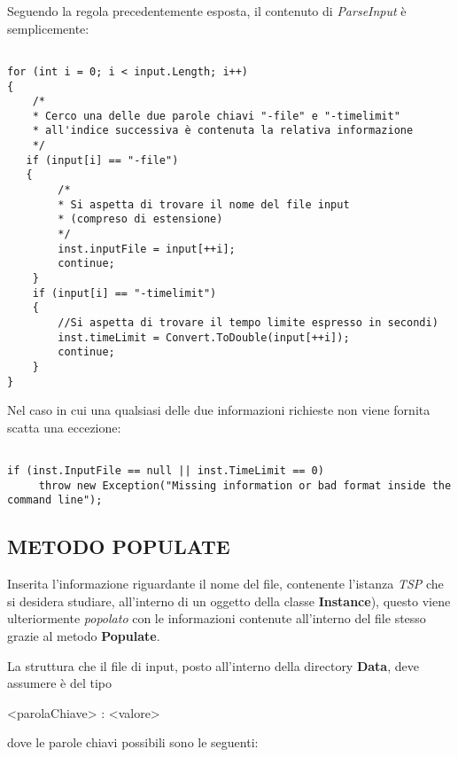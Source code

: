 \documentclass[11pt]{article}
\begin{document}
Seguendo la regola precedentemente esposta, il contenuto di \textit{ParseInput} è semplicemente:

\begin{lstlisting}

for (int i = 0; i < input.Length; i++)
{
    /*
    * Cerco una delle due parole chiavi "-file" e "-timelimit"
    * all'indice successiva è contenuta la relativa informazione
    */
   if (input[i] == "-file")
   {
        /*
        * Si aspetta di trovare il nome del file input
        * (compreso di estensione)
        */
        inst.inputFile = input[++i];
        continue;
    }
    if (input[i] == "-timelimit")
    {
        //Si aspetta di trovare il tempo limite espresso in secondi)
        inst.timeLimit = Convert.ToDouble(input[++i]);
        continue;
    }
}
\end{lstlisting}

Nel caso in cui una qualsiasi delle due informazioni richieste non viene fornita scatta una eccezione:

\begin{lstlisting}

if (inst.InputFile == null || inst.TimeLimit == 0)
     throw new Exception("Missing information or bad format inside the command line");

\end{lstlisting}

\subsection*{METODO POPULATE}
\label{sec:MetodoPopulateS}

Inserita l'informazione riguardante il nome del file, contenente l'istanza \textit{TSP} che si desidera studiare, all'interno di un oggetto della classe \textbf{Instance}), questo viene ulteriormente \textit{popolato} con le informazioni contenute all'interno del file stesso grazie al metodo \textbf{Populate}.

La struttura che il file di input, posto all'interno della directory \textbf{Data}, deve assumere è del tipo

\begin{center}
<parolaChiave> : <valore>
\end{center}

dove le parole chiavi possibili sono le seguenti:
\end{document}
